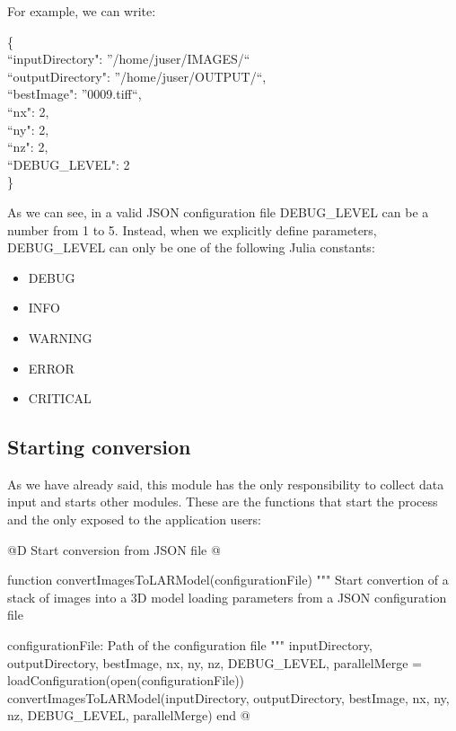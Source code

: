 \documentclass[11pt,oneside]{article}	%
\begin{document}
For example, we can write:

\begin{tabbing}
\{ \= \\
\>  ``inputDirectory": ''/home/juser/IMAGES/``\\
\>  ``outputDirectory": ''/home/juser/OUTPUT/``,\\
\>  ``bestImage": ''0009.tiff``,\\
\>  ``nx": 2,\\
\>  ``ny": 2,\\
\>  ``nz": 2,\\
\>  ``DEBUG\_LEVEL": 2\\
\}\\
\end{tabbing}

As we can see, in a valid JSON configuration file DEBUG\_LEVEL can be a number from 1 to 5. Instead, when we explicitly define parameters, DEBUG\_LEVEL can only be one of the following Julia constants:

\begin{itemize}
 \item DEBUG
 \item INFO
 \item WARNING
 \item ERROR
 \item CRITICAL
\end{itemize}

\subsection{Starting conversion}\label{sec:input}

As we have already said, this module has the only responsibility to collect data input and starts other modules. These are the functions that start the process and the only exposed to the application users:

@D Start conversion from JSON file
@{function convertImagesToLARModel(configurationFile)
  """
  Start convertion of a stack of images into a 3D model
  loading parameters from a JSON configuration file

  configurationFile: Path of the configuration file
  """
  inputDirectory, outputDirectory, bestImage, nx, ny, nz,
      DEBUG_LEVEL, parallelMerge = loadConfiguration(open(configurationFile))
  convertImagesToLARModel(inputDirectory, outputDirectory, bestImage,
			nx, ny, nz, DEBUG_LEVEL, parallelMerge)
end
@}
\end{document}
